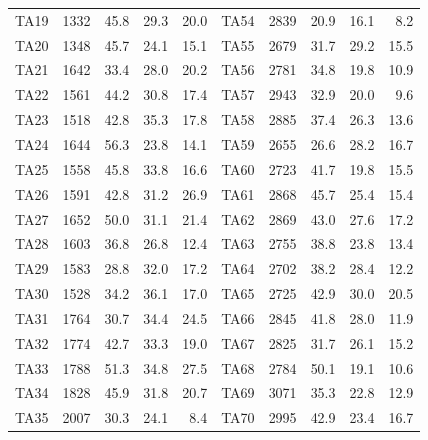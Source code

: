 \documentclass[review,authoryear,11pt]{elsarticle}
\begin{document}
\begin{table}[t]
\begin{tabular}{lrrrr@{\hskip 0.9em}|@{\hskip 0.9em}lrrrr}
TA19 & 1332 & 45.8 & 29.3 & 20.0 & TA54 & 2839 & 20.9 & 16.1 & 8.2 \\
TA20 & 1348 & 45.7 & 24.1 & 15.1 & TA55 & 2679 & 31.7 & 29.2 & 15.5 \\
TA21 & 1642 & 33.4 & 28.0 & 20.2 & TA56 & 2781 & 34.8 & 19.8 & 10.9 \\
TA22 & 1561 & 44.2 & 30.8 & 17.4 & TA57 & 2943 & 32.9 & 20.0 & 9.6 \\
TA23 & 1518 & 42.8 & 35.3 & 17.8 & TA58 & 2885 & 37.4 & 26.3 & 13.6 \\
TA24 & 1644 & 56.3 & 23.8 & 14.1 & TA59 & 2655 & 26.6 & 28.2 & 16.7 \\
TA25 & 1558 & 45.8 & 33.8 & 16.6 & TA60 & 2723 & 41.7 & 19.8 & 15.5 \\
TA26 & 1591 & 42.8 & 31.2 & 26.9 & TA61 & 2868 & 45.7 & 25.4 & 15.4 \\
TA27 & 1652 & 50.0 & 31.1 & 21.4 & TA62 & 2869 & 43.0 & 27.6 & 17.2 \\
TA28 & 1603 & 36.8 & 26.8 & 12.4 & TA63 & 2755 & 38.8 & 23.8 & 13.4 \\
TA29 & 1583 & 28.8 & 32.0 & 17.2 & TA64 & 2702 & 38.2 & 28.4 & 12.2 \\
TA30 & 1528 & 34.2 & 36.1 & 17.0 & TA65 & 2725 & 42.9 & 30.0 & 20.5 \\
TA31 & 1764 & 30.7 & 34.4 & 24.5 & TA66 & 2845 & 41.8 & 28.0 & 11.9 \\
TA32 & 1774 & 42.7 & 33.3 & 19.0 & TA67 & 2825 & 31.7 & 26.1 & 15.2 \\
TA33 & 1788 & 51.3 & 34.8 & 27.5 & TA68 & 2784 & 50.1 & 19.1 & 10.6 \\
TA34 & 1828 & 45.9 & 31.8 & 20.7 & TA69 & 3071 & 35.3 & 22.8 & 12.9 \\
TA35 & 2007 & 30.3 & 24.1 & 8.4 & TA70 & 2995 & 42.9 & 23.4 & 16.7 \\
\bottomrule
\end{tabular}
\end{table}
\end{document}
